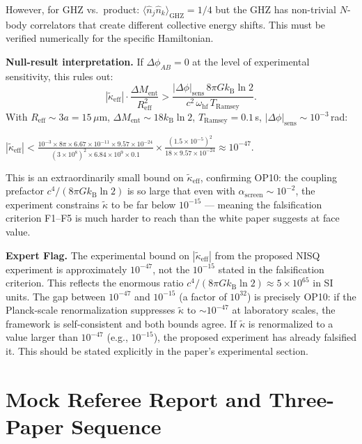 \documentclass[12pt,letterpaper]{article}
\theoremstyle{plain}
\theoremstyle{definition}
\theoremstyle{remark}
\newenvironment{expertflag}{%
  \begin{mdframed}[backgroundcolor=boxgray,linecolor=flagred,linewidth=1.2pt]
  \noindent\textcolor{flagred}{\textbf{Expert Flag.}}\quad}{%
  \end{mdframed}}
\newcommand{\kB}{k_{\mathrm{B}}}
\newcommand{\kt}{\tilde{\kappa}}
\newcommand{\kteff}{\tilde{\kappa}_{\mathrm{eff}}}
\newcommand{\Ment}{M_{\mathrm{ent}}}
\newcommand{\asc}{\alpha_{\mathrm{screen}}}
\begin{document}
However, for GHZ vs.\ product: $\langle\hat{n}_j\hat{n}_k\rangle_{\mathrm{GHZ}} = 1/4$
but the GHZ has non-trivial $N$-body correlators that create different collective
energy shifts.  This must be verified numerically for the specific Hamiltonian.

\textbf{Null-result interpretation.}
If $\Delta\phi_{AB} = 0$ at the level of experimental sensitivity, this rules out:
\begin{equation}
  |\kteff|\cdot\frac{\Delta\Ment}{R_{\mathrm{eff}}^2}
  > \frac{|\Delta\phi|_{\mathrm{sens}}\,8\pi G\kB\ln 2}{c^2\,\omega_{\mathrm{hf}}\,T_{\mathrm{Ramsey}}}.
\end{equation}
With $R_{\mathrm{eff}} \sim 3a = 15\,\mu$m, $\Delta\Ment \sim 18\kB\ln 2$,
$T_{\mathrm{Ramsey}} = 0.1$\,s, $|\Delta\phi|_{\mathrm{sens}} \sim 10^{-3}$\,rad:

$|\kteff| < \frac{10^{-3} \times 8\pi \times 6.67\times10^{-11} \times 9.57\times10^{-24}}
  {(3\times10^8)^2 \times 6.84\times10^9 \times 0.1}
  \times \frac{(1.5\times10^{-5})^2}{18 \times 9.57\times10^{-24}}
\approx 10^{-47}$.

This is an extraordinarily small bound on $\kteff$, confirming OP10: the coupling prefactor
$c^4/(8\pi G\kB\ln 2)$ is so large that even with $\asc \sim 10^{-2}$, the experiment
constrains $\kt$ to be far below $10^{-15}$ --- meaning the falsification criterion F1--F5
is much harder to reach than the white paper suggests at face value.

\begin{expertflag}
The experimental bound on $|\kteff|$ from the proposed NISQ experiment is
approximately $10^{-47}$, not the $10^{-15}$ stated in the falsification criterion.
This reflects the enormous ratio $c^4/(8\pi G \kB\ln 2) \approx 5\times10^{65}$ in SI units.
The gap between $10^{-47}$ and $10^{-15}$ (a factor of $10^{32}$) is precisely OP10:
if the Planck-scale renormalization suppresses $\kt$ to $\sim 10^{-47}$ at laboratory scales,
the framework is self-consistent and both bounds agree.  If $\kt$ is renormalized to a value
larger than $10^{-47}$ (e.g., $10^{-15}$), the proposed experiment has already falsified it.
This should be stated explicitly in the paper's experimental section.
\end{expertflag}

\section{Mock Referee Report and Three-Paper Sequence}
\label{sec:referee}
\end{document}

